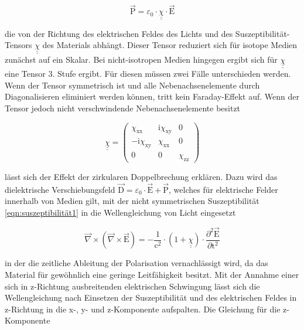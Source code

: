         \begin{equation}
            \vec{\text{P}} = \varepsilon_0 \cdot \underline{\underline{\chi}} \cdot \vec{\text{E}} 
            \label{eqn:polarisation}
        \end{equation}

        die von der Richtung des elektrischen Feldes des Lichts und des Suszeptibilität-Tensors $\underline{\underline{\chi}}$ des Materials abhängt. Dieser Tensor reduziert sich für isotope Medien zunächst
        auf ein Skalar. Bei nicht-isotropen Medien hingegen ergibt sich für $\underline{\underline{\chi}}$ eine Tensor 3. Stufe ergibt. Für diesen müssen zwei Fälle unterschieden werden. Wenn der Tensor 
        symmetrisch ist und alle Nebenachsenelemente durch Diagonalisieren eliminiert werden können, tritt kein Faraday-Effekt auf. Wenn der Tensor jedoch nicht verschwindende Nebenachsenelemente besitzt
        
        \begin{equation*}
            \underline{\underline{\chi}} =
            \begin{pmatrix}
                \chi_{\text{xx}} & \text{i} \chi_{\text{xy}} & 0 \\
                -\text{i}\chi_{\text{xy}} & \chi_{\text{xx}} & 0 \\
                0 & 0 & \chi_{\text{zz}}
            \end{pmatrix}
            \label{eqn:suszeptibilität1}
        \end{equation*}

        lässt sich der Effekt der zirkularen Doppelbrechung erklären. Dazu wird das dielektrische Verschiebungsfeld $\vec{\text{D}} = \varepsilon_0 \cdot \vec{\text{E}} + \vec{\text{P}}$, welches für elektrische Felder
        innerhalb von Medien gilt, mit der nicht symmetrischen Suszeptibilität \ref{eqn:suszeptibilität1} in die Wellengleichung von Licht eingesetzt

        \begin{equation*}
            \vec{\nabla} \times \left(\vec{\nabla} \times \vec{\text{E}}\right) = - \frac{1}{\text{c}^2} \cdot \left(1 + \underline{\underline{\chi}}\right) \cdot \frac{\partial^2\vec{\text{E}}}{\partial\text{t}^2}
        \end{equation*}

        in der die zeitliche Ableitung der Polarisation vernachlässigt wird, da das Material für gewöhnlich eine geringe Leitfähigkeit besitzt. Mit der Annahme einer sich in z-Richtung ausbreitenden 
        elektrischen Schwingung lässt sich die Wellengleichung nach Einsetzen der Suszeptibilität und des elektrischen Feldes in z-Richtung in die x-, y- und z-Komponente aufspalten. Die Gleichung für die 
        z-Komponente

